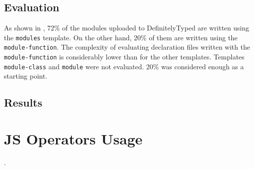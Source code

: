 \subsection{Evaluation}
As shown in , 72\% of the modules uploaded to DefinitelyTyped are written using the \texttt{modules} template. On the other hand, 20\% of them are written using the \texttt{module-function}. The complexity of evaluating declaration files written with the \texttt{module-function} is considerably lower than for the other templates. Templates \texttt{module-class} and \texttt{module} were not evaluated. 20\% was considered enough as a starting point.



\subsection{Results}













\section{JS Operators Usage} \label{sec:experiments-js-operators-usage}
.




